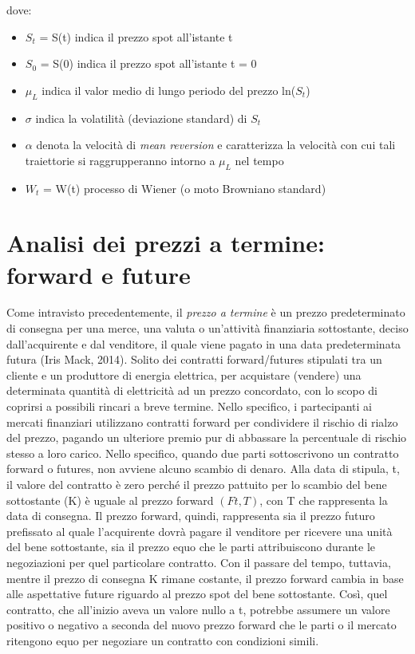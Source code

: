 \documentclass[12pt,a4paper]{report}
\begin{document}
dove:
\begin{itemize}
    \item $S_t$ = S(t) indica il prezzo spot all'istante t
    \item $S_0$ = S(0) indica il prezzo spot all'istante t = 0
    \item $\mu_L$ indica il valor medio di lungo periodo del prezzo ln($S_t$)
    \item $\sigma$ indica la volatilità (deviazione standard) di $S_t$
    \item $\alpha$ denota la velocità di \textit{mean reversion} e caratterizza la velocità con cui tali traiettorie si raggrupperanno intorno a $\mu_L$ nel tempo
    \item $W_t$ = W(t) processo di Wiener (o moto Browniano standard)
\end{itemize}



\section{Analisi dei prezzi a termine: forward e future}


Come intravisto precedentemente, il \textit{prezzo a termine} è un prezzo predeterminato di consegna per una merce, una valuta o un'attività finanziaria sottostante, deciso dall'acquirente e dal venditore, il quale viene pagato in una data predeterminata futura (Iris Mack, 2014). Solito dei contratti forward/futures stipulati tra un cliente e un produttore di energia elettrica, per acquistare (vendere) una determinata quantità di elettricità ad un prezzo concordato, con lo scopo di coprirsi a possibili rincari a breve termine. Nello specifico, i partecipanti ai mercati finanziari utilizzano contratti forward per condividere il rischio di rialzo del prezzo, pagando un ulteriore premio pur di abbassare la percentuale di rischio stesso a loro carico.
Nello specifico, quando due parti sottoscrivono un contratto forward o futures, non avviene alcuno scambio di denaro. Alla data di stipula, t, il valore del contratto è zero perché il prezzo pattuito per lo scambio del bene sottostante (K) è uguale al prezzo forward $(Ft,T)$, con T che rappresenta la data di consegna. Il prezzo forward, quindi, rappresenta sia il prezzo futuro prefissato al quale l'acquirente dovrà pagare il venditore per ricevere una unità del bene sottostante, sia il prezzo equo che le parti attribuiscono durante le negoziazioni per quel particolare contratto. Con il passare del tempo, tuttavia, mentre il prezzo di consegna K rimane costante, il prezzo forward cambia in base alle aspettative future riguardo al prezzo spot del bene sottostante. Così, quel contratto, che all'inizio aveva un valore nullo a t, potrebbe assumere un valore positivo o negativo a seconda del nuovo prezzo forward che le parti o il mercato ritengono equo per negoziare un contratto con condizioni simili.
\end{document}
